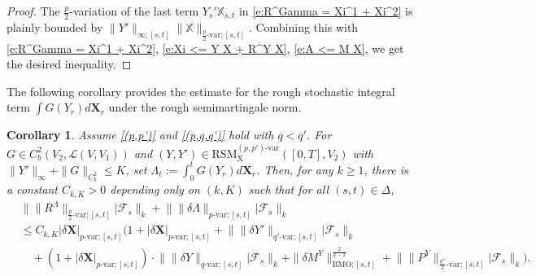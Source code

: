 \documentclass[11pt,reqno]{amsart}
\newtheorem{corollary}[lemma]{Corollary}
\numberwithin{equation}{section}
\begin{document}
\begin{proof}
The $\frac{p}{2}$-variation of the last term $Y_s'\mathbb X_{s,t}$ in \eqref{e:R^Gamma = Xi^1 + Xi^2} is plainly bounded by $ \|Y'\|_{\infty;[s,t]} \|\mathbb X\|_{\frac{p}{2}\text{-}\mathrm{var};[s,t]}$.
Combining this with \eqref{e:R^Gamma = Xi^1 + Xi^2}, \eqref{e:Xi <= Y X + R^Y X}, \eqref{e:A <= M X}, we get the desired inequality.
\end{proof}
 

The following corollary provides the estimate for the rough stochastic integral term $\int G(Y_r) d\mathbf X_r$ under the rough semimartingale norm. 

\begin{corollary}\label{cor:int of the solution}
Assume \ref{(p,p')} and  \ref{(p,q,q')} hold with $q < q'$. For $G\in C^{2}_b(V_2,\mathscr L(V,V_1))$ and $(Y,Y') \in \mathrm{RSM}^{(p,p')\text{-}\mathrm{var}}_{\mathrm X}([0,T],V_2)$ with $\| Y' \|_{\infty} + \| G \|_{C^{2}_{b}} \le K$, set $\Lambda_{t} :=\int_{0}^{t}G(Y_{r})d\mathbf X_{r}$. 
Then, for any $k \ge 1$, there is a constant $C_{k,K} > 0$ depending only on $(k,K)$ such that for all $(s,t)\in\Delta$,
\begin{equation}\label{e:(Gamma,-H(Y))}
\begin{aligned}
&\big\| \|R^{\Lambda}\|_{\frac{p}{2}\text{-}\mathrm{var};[s,t]}\big| \mathcal F_{s} \big\|_{k} + \big\| \|\delta \Lambda\|_{p\text{-}\mathrm{var};[s,t]} \big| \mathcal F_{s}\big\|_{k} \\
&\le C_{k,K} |\delta \mathbf X|_{p\text{-}\mathrm{var};[s,t]} \Big(1 + |\delta \mathbf X|_{p\text{-}\mathrm{var};[s,t]} + \big\| \|\delta Y'\|_{q'\text{-}\mathrm{var};[s,t]}\big|\mathcal F_{s}\big\|_{k}\\
& \quad + (1+  |\delta \mathbf X|_{p\text{-}\mathrm{var};[s,t]}) \cdot \big\|\|\delta Y\|_{q\text{-}\mathrm{var};[s,t]} \big| \mathcal F_{s}\big\|_{k} +  \|\delta M^{Y}\|^{\frac{2}{q-2}}_{\mathrm{BMO};[s,t]} + \big\|  \|P^Y\|_{\frac{q''}{2}\text{-}\mathrm{var};[s,t]}\big|\mathcal F_{s}\big\|_{k}  \Big).
\end{aligned}
\end{equation}
\end{corollary}
\end{document}
